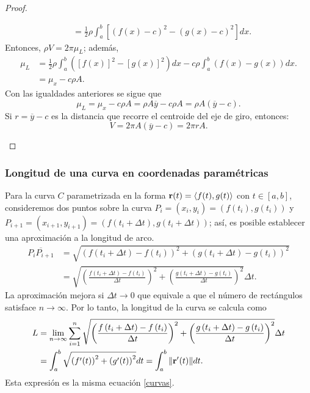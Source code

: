 \begin{proof}
\begin{parrafoitemize}
\begin{align*}
      &= \frac{1}{2}\rho \int_{a}^{b}\left[ \left( f(x) -c\right) ^{2}-\left(g(x) -c\right) ^{2}\right] dx.
    \end{align*}
    Entonces, $\rho V = 2\pi \mu_L$; además,
    \begin{align*}\mu_{L} &= \frac{1}{2}\rho\int_{a}^{b}\left([f(x)]^2-[g(x)]^2\right)dx-c\rho\int_{a}^{b}\left(f(x) -g(x)\right)dx. \\
    &= \mu_x-c\rho A.
    \end{align*}
    Con las igualdades anteriores se sigue que
    \[\mu_{L}=\mu_x-c\rho A=\rho A \overline{y}-c\rho A= \rho A (\overline{y}-c).\]
    Si $r=\overline{y}-c$ es la distancia que recorre el centroide del eje de giro, entonces:
    \[V=2\pi A (\overline{y}-c)=2\pi r A.\]
  \end{parrafoitemize}
  \vspace*{-2\baselineskip}
\end{proof}

\subsubsection{Longitud de una curva en coordenadas paramétricas}

Para la curva $C$ parametrizada en la forma ${\bf r}(t)=\langle f(t),g(t)\rangle$ con $t\in [a,b]$,
consideremos dos puntos sobre la curva
$P_{i}=\left( x_{i},y_{i}\right) =\left( f\left( t_{i}\right) ,g\left(t_{i}\right) \right) $
y $P_{i+1}=\left( x_{i+1},y_{i+1}\right) =\left( f\left( t_{i}+\Delta t\right),g\left( t_{i}+\Delta t\right) \right) $;
así, es posible establecer una aproximación a la longitud de arco.
\begin{align*}
  \overline{P_{i}P_{i+1}}&=\sqrt{\left( f\left( t_{i}+\Delta t\right) -f\left( t_{i}\right) \right) ^{2}+\left( g\left( t_{i}+\Delta t\right) -g\left( t_{i}\right) \right) ^{2}} \\
  &=\sqrt{\left( \frac{f\left( t_{i}+\Delta t\right) -f\left(t_{i}\right) }{\Delta t}\right) ^{2}+\left( \frac{g\left( t_{i}+\Delta t\right) -g\left( t_{i}\right) }{\Delta t}\right) ^{2}}\Delta t.
\end{align*}
La aproximación mejora si $\Delta t\to 0$ que equivale a que el número de rectángulos satisface $n \to \infty$.
Por lo tanto, la longitud de la curva se calcula como
\begin{align*}
  L&=\lim_{n\rightarrow \infty } \sum_{i=1}^{n}\sqrt{\left( \frac{%
    f\left( t_{i}+\Delta t\right) -f\left( t_{i}\right) }{\Delta t}\right)
    ^{2}+ \left( \frac{g\left( t_{i}+\Delta t\right) -g\left( t_{i}\right) }{%
  \Delta t}\right) ^{2}}\Delta t\\
  &=\int_{a}^{b}\sqrt{\left(f^{\prime}(t)\right)^{2}+\left(g^{\prime}(t)\right)^{2}}dt=\int_{a}^{b}\Vert{\bf r}^\prime(t)\Vert dt.
\end{align*}
Esta expresión es la misma ecuación \ref{curvas}.
